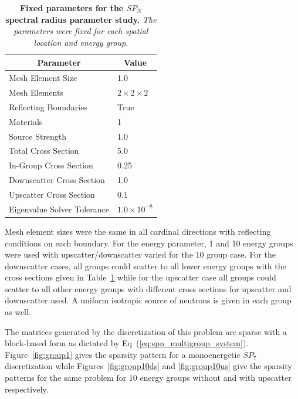 \begin{table}[h!]
  \begin{center}
    \begin{tabular}{ll}\hline\hline
      \multicolumn{1}{c}{Parameter}& 
      \multicolumn{1}{c}{Value} \\\hline
      Mesh Element Size & 1.0 \\
      Mesh Elements & $2 \times 2 \times 2$ \\
      Reflecting Boundaries & True \\
      Materials & 1 \\
      Source Strength & 1.0 \\
      Total Cross Section & 5.0 \\
      In-Group Cross Section & 0.25 \\
      Downscatter Cross Section & 1.0 \\
      Upscatter Cross Section & 0.1 \\
      Eigenvalue Solver Tolerance & $1.0\times10^{-8}$ \\
      \hline\hline
    \end{tabular}
  \end{center}
  \caption{\textbf{Fixed parameters for the $SP_N$ spectral radius
      parameter study.} \textit{The parameters were fixed for each
      spatial location and energy group.}}
  \label{tab:spn_fixed_parameters}
\end{table}

Mesh element sizes were the same in all cardinal directions with
reflecting conditions on each boundary. For the energy parameter, 1
and 10 energy groups were used with upscatter/downscatter varied for
the 10 group case. For the downscatter cases, all groups could scatter
to all lower energy groups with the cross sections given in
Table~\ref{tab:spn_fixed_parameters} while for the upscatter case all
groups could scatter to all other energy groups with different cross
sections for upscatter and downscatter used. A uniform isotropic
source of neutrons is given in each group as well.

The matrices generated by the discretization of this problem are
sparse with a block-based form as dictated by
Eq~(\ref{eq:spn_multigroup_system}). Figure~\ref{fig:group1} gives the
sparsity pattern for a monoenergetic $SP_7$ discretization while
Figures~\ref{fig:group10ds} and \ref{fig:group10us} give the sparsity
patterns for the same problem for 10 energy groups without and with
upscatter respectively.

